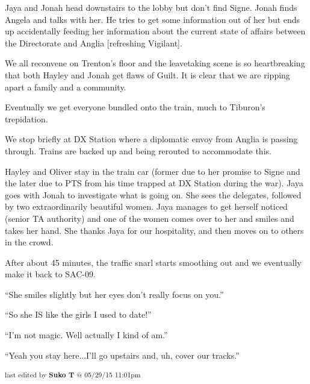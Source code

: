 Jaya and Jonah head downstairs to the lobby but don't find Signe.  Jonah finds Angela and talks with her.  He tries to get some information out of her but ends up accidentally feeding her information about the current state of affairs between the Directorate and Anglia {[}refreshing Vigilant{]}.



We all reconvene on Trenton's floor and the leavetaking scene is so heartbreaking that both Hayley and Jonah get flaws of Guilt. It is clear that we are ripping apart a family and a community.



Eventually we get everyone bundled onto the train, much to Tiburon's trepidation.



We stop briefly at DX Station where a diplomatic envoy from Anglia is passing through.  Trains are backed up and being rerouted to accommodate this.



Hayley and Oliver stay in the train car (former due to her promise to Signe and the later due to PTS from his time trapped at DX Station during the war).  Jaya goes with Jonah to investigate what is going on.  She sees the delegates, followed by two extraordinarily beautiful women.  Jaya manages to get herself noticed (senior TA authority) and one of the women comes over to her and smiles and takes her hand.  She thanks Jaya for our hospitality, and then moves on to others in the crowd.



After about 45 minutes, the traffic snarl starts smoothing out and we eventually make it back to SAC-09.



``She smiles slightly but her eyes don't really focus on you.''

``So she IS like the girls I used to date!''




``I'm not magic.  Well actually I kind of am.''




``Yeah you stay here...I'll go upstairs and, uh, cover our tracks.''



\vspace{\fill}

\begin{flushright}
\textsubscript{last edited by \textbf{Suko T} @ 05/29/15 11:01pm}
\end{flushright}
